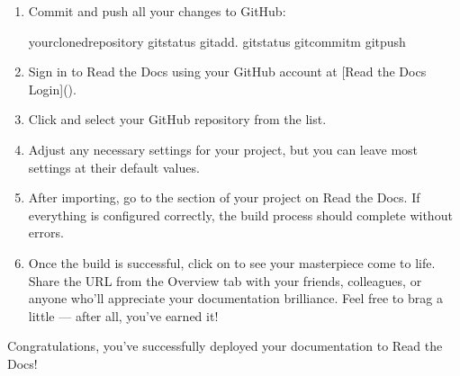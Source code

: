 \documentclass[a4paper,10pt,english]{sphinxmanual}
\begin{document}
\begin{enumerate}
\item {} 
\sphinxAtStartPar
{}

\sphinxAtStartPar
Commit and push all your changes to GitHub:

\begin{sphinxVerbatim}[commandchars=\\\{\}]
\PYGZlt{}your\PYGZhy{}cloned\PYGZhy{}repository\PYGZgt{}
gitstatus
gitadd.
gitstatus
gitcommit\PYGZhy{}m
gitpush
\end{sphinxVerbatim}

\item {} 
\sphinxAtStartPar
{}

\sphinxAtStartPar
Sign in to Read the Docs using your GitHub account at {[}Read the Docs Login{]}().

\item {} 
\sphinxAtStartPar
{}

\sphinxAtStartPar
Click  and select your GitHub repository from the list.

\item {} 
\sphinxAtStartPar
{}

\sphinxAtStartPar
Adjust any necessary settings for your project, but you can leave most settings at their default values.

\item {} 
\sphinxAtStartPar
{}

\sphinxAtStartPar
After importing, go to the  section of your project on Read the Docs. If everything is configured correctly, the build process should complete without errors.

\item {} 
\sphinxAtStartPar
{}

\sphinxAtStartPar
Once the build is successful, click on  to see your masterpiece come to life. Share the URL from the Overview tab with your friends, colleagues, or anyone who’ll appreciate your documentation brilliance. Feel free to brag a little — after all, you’ve earned it!

\end{enumerate}

\sphinxAtStartPar
Congratulations, you’ve successfully deployed your documentation to Read the Docs!



\renewcommand{\indexname}{Index}
\printindex
\end{document}
